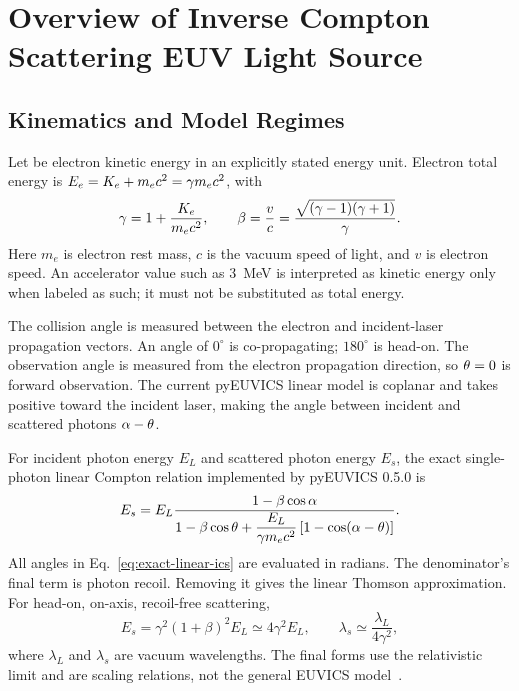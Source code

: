 \section{Overview of Inverse Compton Scattering EUV Light Source}

\subsection{Kinematics and Model Regimes}

Let \electronKineticEnergy{} be electron kinetic energy in an explicitly stated
energy unit. Electron total energy is
$E_{e}=K_{e}+m_{e}c^{2}=\gamma m_{e}c^{2}$,
with
\[
  \gamma=1+\frac{K_{e}}{m_{e}c^{2}},
  \qquad
  \beta=\frac{v}{c}=\frac{\sqrt{(\gamma-1)(\gamma+1)}}{\gamma}.
\]
Here $m_e$ is electron rest mass, $c$ is the vacuum speed of light, and $v$ is
electron speed. An accelerator value such as 3~MeV is interpreted as kinetic
energy only when labeled as such; it must not be substituted as total energy.

The collision angle \collisionAngle{} is measured between the electron and
incident-laser propagation vectors. An angle of $0^\circ$ is co-propagating;
$180^\circ$ is head-on. The observation angle \observationAngle{} is measured from the
electron propagation direction, so $\theta=0$ is forward observation.
The current pyEUVICS linear model is coplanar and takes positive
\observationAngle{} toward the incident laser, making the angle between incident
and scattered photons $\alpha-\theta$.

For incident photon energy $E_L$ and scattered photon energy $E_s$, the exact
single-photon linear Compton relation implemented by pyEUVICS 0.5.0 is
\begin{equation}
  E_s=E_L
  \frac{1-\beta\cos\alpha}
  {1-\beta\cos\theta+
  \dfrac{E_L}{\gamma m_{e}c^{2}}
  \left[1-\cos(\alpha-\theta)\right]}.
  \label{eq:exact-linear-ics}
\end{equation}
All angles in Eq.~\ref{eq:exact-linear-ics} are evaluated in radians. The
denominator's final term is photon recoil. Removing it gives the linear Thomson
approximation. For head-on, on-axis, recoil-free scattering,
\begin{equation}
  E_s=\gamma^2(1+\beta)^2E_L\simeq4\gamma^2E_L,
  \qquad
  \lambda_s\simeq\frac{\lambda_L}{4\gamma^2},
  \label{eq:ics-limiting-scaling}
\end{equation}
where $\lambda_L$ and $\lambda_s$ are vacuum wavelengths. The final forms use
the relativistic limit and are scaling relations, not the general EUVICS
model~\cite{pyEUVICSConventions050,pyEUVICSEquations050}.

